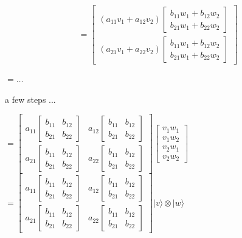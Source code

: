 \documentclass[main.tex]{subfiles}
\begin{document}
    $$
    =\left[\begin{array}{l}
    \left(a_{11} v_{1}+a_{12} v_{2}\right)\left[\begin{array}{l}
    b_{11} w_{1}+b_{12} w_{2} \\
    b_{21} w_{1}+b_{22} w_{2}
    \end{array}\right] \\
    \left(a_{21} v_{1}+a_{22} v_{2}\right)\left[\begin{array}{l}
    b_{11} w_{1}+b_{12} w_{2} \\
    b_{21} w_{1}+b_{22} w_{2}
    \end{array}\right]
    \end{array}\right]
    $$
    
    $=\ldots$ 
    
    a few steps ...
    
    $=\left[\begin{array}{ll}a_{11}\left[\begin{array}{ll}b_{11} & b_{12} \\ b_{21} & b_{22}\end{array}\right] & a_{12}\left[\begin{array}{ll}b_{11} & b_{12} \\ b_{21} & b_{22}\end{array}\right] \\ a_{21}\left[\begin{array}{ll}b_{11} & b_{12} \\ b_{21} & b_{22}\end{array}\right] & a_{22}\left[\begin{array}{ll}b_{11} & b_{12} \\ b_{21} & b_{22}\end{array}\right]\end{array}\right]\left[\begin{array}{l}v_{1} w_{1} \\ v_{1} w_{2} \\ v_{2} w_{1} \\ v_{2} w_{2}\end{array}\right]$ $=\left[\begin{array}{ll}a_{11}\left[\begin{array}{ll}b_{11} & b_{12} \\ b_{21} & b_{22}\end{array}\right] & a_{12}\left[\begin{array}{ll}b_{11} & b_{12} \\ b_{21} & b_{22}\end{array}\right] \\ a_{21}\left[\begin{array}{ll}b_{11} & b_{12} \\ b_{21} & b_{22}\end{array}\right] & a_{22}\left[\begin{array}{ll}b_{11} & b_{12} \\ b_{21} & b_{22}\end{array}\right]\end{array}\right]|v\rangle \otimes|w\rangle$
    
\end{document}
